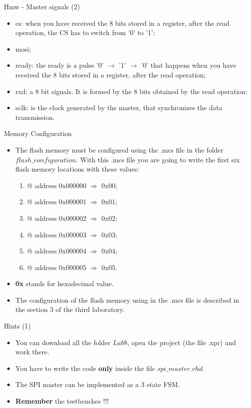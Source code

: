 \documentclass{beamer}
\begin{document}
 
   \begin{frame}{Hmw - Master signals (2)}
   	   	
   	\begin{itemize}
   		\item cs: when you have received the 8 bits stored in a register, after the read operation, the CS has to switch from '0' to '1';
   		\item mosi;
   		\item ready: the ready is a pulse '0' $\rightarrow$ '1' $\rightarrow$ '0' that happens when you have received the 8 bits stored in a register, after the read operation;
        \item rxd: a 8 bit signals. It is formed by the 8 bits obtained by the read operation;   		
   		\item sclk: is the clock generated by the master, that synchronizes the data transmission.
   	\end{itemize}     	
   \end{frame}    
   
   \begin{frame}{Memory Configuration}
   	\begin{itemize}
   		\item The flash memory must be configured using the .mcs file in the folder $flash\_configuration$. With this .mcs file you are going to write the first six flash memory locations with these values:
   		\begin{enumerate}
   			\item @ address 0x000000 $\Rightarrow$ 0x00;
   			\item @ address 0x000001 $\Rightarrow$ 0x01;
   			\item @ address 0x000002 $\Rightarrow$ 0x02;
   			\item @ address 0x000003 $\Rightarrow$ 0x03;
   			\item @ address 0x000004 $\Rightarrow$ 0x04;
   			\item @ address 0x000005 $\Rightarrow$ 0x05.
   		\end{enumerate}
   		\item \textbf{0x} stands for hexadecimal value.
   		\item The configuration of the flash memory using in the .mcs file is described in the section 3 of the third laboratory.   		
   	\end{itemize}
   \end{frame}
 
   \begin{frame}{Hints (1)}
   	\begin{itemize}
   		\item You can download  all the folder $Lab8$, open the project (the file .xpr) and work there.
   		\item You have to write the code \textbf{only} inside the file	$spi\_master.vhd$.
   		\item The SPI master can be implemented as a 3 state FSM.
   		\item \textbf{Remember} the testbenches !!!
   	\end{itemize}
   \end{frame} 
   
\end{document}
